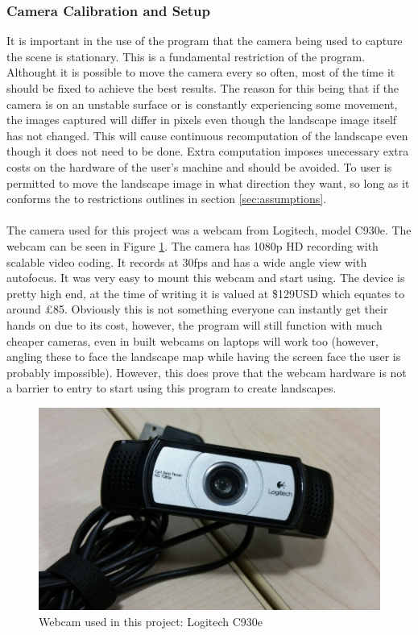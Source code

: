 \documentclass[11pt]{article}
\begin{document}
\subsubsection{Camera Calibration and Setup}
It is important in the use of the program that the camera being used to
capture the scene is stationary. This is a fundamental restriction of the 
program. Althought it is possible to move the camera every so often,
most of the time it should be fixed to achieve the best results. The reason
for this being that if the camera is on an unstable surface or is constantly
experiencing some movement, the images captured will differ in pixels even though
the landscape image itself has not changed. This will cause continuous
recomputation of the landscape even though it does not need to be done. Extra
computation imposes unecessary extra costs on the hardware of the user's machine
and should be avoided. To user is permitted to move the landscape image in 
what direction they want, so long as it conforms the to restrictions
outlines in section \ref{sec:assumptions}.\\
\\
The camera used for this project was a webcam from Logitech, model C930e.
The webcam can be seen in Figure \ref{webcam}. The camera has 1080p HD 
recording with scalable video coding. It records at 30fps and has a wide 
angle view with autofocus. It was very easy to mount this webcam and start
using. The device is pretty high end, at the time of writing it is valued
at \$129USD which equates to around £85. Obviously this is not something
everyone can instantly get their hands on due to its cost, however, the
program will still function with much cheaper cameras, even in built
webcams on laptops will work too (however, angling these to face the 
landscape map while having the screen face the user is probably impossible).
However, this does prove that the webcam hardware is not a barrier to 
entry to start using this program to create landscapes. 

\begin{figure}[H]
	\centering
	\includegraphics[scale=0.6]{pics/camera.jpg}
	\caption{Webcam used in this project: Logitech C930e}
	\label{webcam}
\end{figure}
\end{document}
